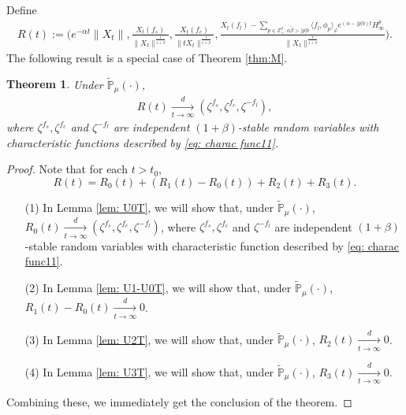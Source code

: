 \documentclass[12pt,a4paper]{amsart}
\theoremstyle{plain}
\newtheorem{thm}{Theorem}[section]
\theoremstyle{definition}
\numberwithin{equation}{section}
\begin{document}
Define
\begin{align}
R(t):=\Bigg(e^{-\alpha t}\|X_t\|, \frac{X_t(f_s)}{\|X_t\|^{\frac{1}{1+\beta}}},\frac{X_t(f_c)}{\|tX_t\|^{\frac{1}{1+\beta}}},\frac{ X_t(f_l) - \sum_{p\in \mathbb Z^d_+:\alpha \tilde \beta>|p|b}\langle f_l,\phi_p\rangle_\varphi e^{(\alpha-|p|b)t}H^p_{\infty}}{\|X_t\|^{\frac{1}{1+\beta}}}\Bigg).
\end{align}
The following result is a special case of Theorem \ref{thm:M}.
\begin{thm}\label{thm: II}
Under $\mathbb{\widetilde{P}}_{\mu}(\cdot)$,
\begin{align}
R(t) \xrightarrow[t\rightarrow\infty]{d}(\zeta^{f_s},\zeta^{f_c},\zeta^{-f_l}),
\end{align}
where $\zeta^{f_s},\zeta^{f_c}$ and $\zeta^{-f_l}$ are independent $(1+\beta)$-stable random variables with characteristic functions described by \eqref{eq: charac func11}.
\end{thm}
\begin{proof}

Note that for each $t>t_0$,
\[
R(t)=R_0(t)+(R_1(t)-R_0(t))+R_2(t)+R_3(t).
\]
\begin{itemize}
\item[(1)] In Lemma \ref{lem: U0T}, we will show that, under $\mathbb{\widetilde{P}}_{\mu}(\cdot)$, $R_0(t) \xrightarrow[t\to \infty]{d}(\zeta^{f_s},\zeta^{f_c},\zeta^{-f_l})$, where $\zeta^{f_s},\zeta^{f_c}$ and $\zeta^{-f_l}$ are independent $(1+\beta)$-stable random variables with characteristic function described by \eqref{eq: charac func11}.
\item[(2)] In Lemma \ref{lem: U1-U0T}, we will show that, under $\mathbb{\widetilde{P}}_{\mu}(\cdot)$, $R_1(t)-R_0(t)\xrightarrow[t\to \infty]{d}0$.
\item[(3)] In Lemma \ref{lem: U2T}, we will show that, under $\mathbb{\widetilde{P}}_{\mu}(\cdot)$, $R_2(t)\xrightarrow[t\to \infty]{d}0$.
\item[(4)] In Lemma \ref{lem: U3T}, we will show that, under $\mathbb{\widetilde{P}}_{\mu}(\cdot)$, $R_3(t)\xrightarrow[t\to \infty]{d}0$.
\end{itemize}
Combining these, we immediately get the conclusion of the theorem.
\end{proof}
\end{document}
